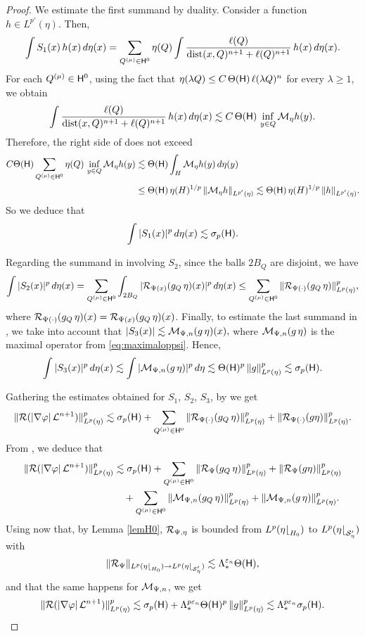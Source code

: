 \begin{proof}
We estimate the first summand by duality. Consider a function $h\in L^{p'}(\eta)$. Then, 
\begin{equation}\label{eqmul429**}
\int S_1(x)\,h(x)\,d\eta(x)= 
  \sum_{Q^{(\mu)}\in {\mathsf{H}}^0} \eta(Q) \int\frac{\ell(Q)}{{\rm dist}(x,Q)^{n+1}+
\ell(Q)^{n+1}}\,h(x)\,d\eta(x).
\end{equation}
For each $Q^{(\mu)}\in{\mathsf{H}}^0$,
 using the fact that $\eta(\lambda Q)\leq C\,\Theta({\mathsf{H}})\,\ell(\lambda Q)^n$ for every $\lambda\geq 1$,
 we obtain 
$$\int  \frac{\ell(Q)}{{\rm dist}(x,Q)^{n+1}+
\ell(Q)^{n+1}}\,h(x)\,d\eta(x)\lesssim C\,\Theta({\mathsf{H}})\,\inf_{y\in Q} {\mathcal M}_\eta h(y).$$
Therefore, the right side of  does not exceed
\begin{align*}
C\Theta({\mathsf{H}})\sum_{Q^{(\mu)}\in {\mathsf{H}}^0} \eta(Q)\,\inf_{y\in Q} {\mathcal M}_\eta h(y) & \lesssim
\Theta({\mathsf{H}}) \int_{H}{\mathcal M}_\eta h(y)\,d\eta(y) \\ 
& \le \Theta({\mathsf{H}})\,\eta(H)^{1/p}\,\|{\mathcal M}_\eta h\|_{L^{p'}(\eta)}
\lesssim \Theta({\mathsf{H}})\,\eta(H)^{1/p}\,\|h\|_{L^{p'}(\eta)}.
\end{align*}
So we deduce that
$$\int |S_1(x)|^p\,d\eta(x)\lesssim \sigma_p({\mathsf{H}}).
$$

Regarding the summand in  involving $S_2$, since the balls $2B_Q$ are disjoint, we have
$$\int |S_2(x)|^p\,d\eta(x) = 
\sum_{Q^{(\mu)}\in {\mathsf{H}}^0} \int_{2B_Q} |{\mathcal R}_{\Psi(x)}(g_Q\,\eta)(x)|^p\,d\eta(x) 
\leq \sum_{Q^{(\mu)}\in {\mathsf{H}}^0}\| {\mathcal R}_{\Psi(\cdot)}(g_Q\,\eta)\|_{L^p(\eta)}^p,$$
where ${\mathcal R}_{\Psi(\cdot)}(g_Q\,\eta)(x) = {\mathcal R}_{\Psi(x)}(g_Q\,\eta)(x)$.
Finally, to estimate the last summand in , we take into account that 
$|S_3(x)|\lesssim {\mathcal M}_{\Psi,n}(g\,\eta)(x),$ where ${\mathcal M}_{\Psi,n}(g\,\eta)$ is the maximal operator from \eqref{eq:maximaloppsi}.
Hence,
$$\int |S_3(x)|^p\,d\eta(x)  \lesssim \int | {\mathcal M}_{\Psi,n}(g\,\eta)|^p\,d\eta \lesssim \Theta({\mathsf{H}})^p\,
\|g\|_{L^p(\eta)}^p \lesssim \sigma_p({\mathsf{H}}).$$

Gathering the estimates obtained for $S_1$, $S_2$, $S_3$, by  we get
$$\|{\mathcal R}(|\nabla{\varphi}|\,{\mathcal L}^{n+1})\|_{L^p(\eta)}^p \lesssim \sigma_p({\mathsf{H}}) +\sum_{Q^{(\mu)}\in {\mathsf{H}}^0}
\|{\mathcal R}_{\Psi(\cdot)}(g_Q\,\eta)\|_{L^p(\eta)}^p + \|{\mathcal R}_{\Psi(\cdot)}(g\eta)\|_{L^p(\eta)}^p.$$
From , we deduce that
\begin{align*}
\|{\mathcal R}(|\nabla{\varphi}|\,{\mathcal L}^{n+1})\|_{L^p(\eta)}^p & \lesssim \sigma_p({\mathsf{H}}) +\sum_{Q^{(\mu)}\in {\mathsf{H}}^0}
\|{\mathcal R}_{\Psi}(g_Q\,\eta)\|_{L^p(\eta)}^p + \|{\mathcal R}_{\Psi}(g\eta)\|_{L^p(\eta)}^p\\
&\quad + \sum_{Q^{(\mu)}\in {\mathsf{H}}^0}
\|{\mathcal M}_{\Psi,n}(g_Q\,\eta)\|_{L^p(\eta)}^p  + \|{\mathcal M}_{\Psi,n}(g\,\eta)\|_{L^p(\eta)}^p.
\end{align*}
Using now that, by Lemma \ref{lemH0}, 
 ${\mathcal R}_{\Psi,\eta}$ is bounded from $L^p(\eta{\lfloor}_{H_0})$ to $L^p(\eta{\lfloor}_{{\mathcal S}'_\eta})$ with 
$$\|{\mathcal R}_\Psi\|_{L^p(\eta{\lfloor}_{H_0})\to L^p(\eta{\lfloor}_{{\mathcal S}'_\eta})}\lesssim \Lambda_*^{{\varepsilon}_n}\Theta({\mathsf{H}}),$$
and that the same happens for ${\mathcal M}_{\Psi,n}$, we get
$$\|{\mathcal R}(|\nabla{\varphi}|\,{\mathcal L}^{n+1})\|_{L^p(\eta)}^p \lesssim \sigma_p({\mathsf{H}}) + \Lambda_*^{p{\varepsilon}_n}\Theta({\mathsf{H}})^p\,\|g\|_{L^p(\eta)}^p \lesssim \Lambda_*^{p{\varepsilon}_n}\sigma_p({\mathsf{H}}).$$
\end{proof}


